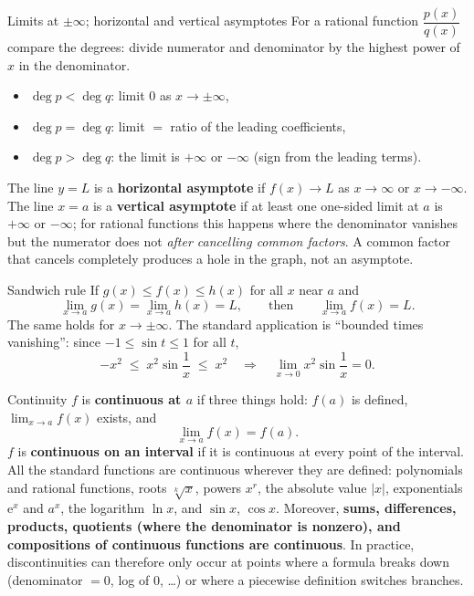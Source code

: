 \begin{rulebox}{Limits at $\pm\infty$; horizontal and vertical asymptotes}
For a rational function $\dfrac{p(x)}{q(x)}$ compare the degrees: divide
numerator and denominator by the highest power of $x$ in the denominator.
\begin{itemize}[leftmargin=1.6em,itemsep=0.3ex]
  \item $\deg p<\deg q$: \quad limit $0$ as $x\to\pm\infty$,
  \item $\deg p=\deg q$: \quad limit $=$ ratio of the leading
        coefficients,
  \item $\deg p>\deg q$: \quad the limit is $+\infty$ or $-\infty$
        (sign from the leading terms).
\end{itemize}
The line $y=L$ is a \textbf{horizontal asymptote} if $f(x)\to L$ as $x\to\infty$ or $x\to-\infty$. The line
$x=a$ is a \textbf{vertical asymptote} if at
least one one-sided limit at $a$ is $+\infty$ or $-\infty$; for rational
functions this happens where the denominator vanishes but the numerator
does not \emph{after cancelling common factors}. A common factor that
cancels completely produces a hole in the graph, not an asymptote.
\end{rulebox}

\begin{rulebox}{Sandwich rule}
If $g(x)\le f(x)\le h(x)$ for all $x$ near $a$ and
\[
  \lim_{x\to a}g(x)=\lim_{x\to a}h(x)=L,
  \qquad\text{then}\qquad
  \lim_{x\to a}f(x)=L .
\]
The same holds for $x\to\pm\infty$. The standard application is
``bounded times vanishing'': since $-1\le\sin t\le 1$ for all $t$,
\[
  -x^{2}\;\le\; x^{2}\sin\frac{1}{x}\;\le\; x^{2}
  \quad\Longrightarrow\quad
  \lim_{x\to 0}x^{2}\sin\frac{1}{x}=0 .
\]
\end{rulebox}

\begin{rulebox}{Continuity}
$f$ is \textbf{continuous at $a$} if three things hold:
$f(a)$ is defined, $\lim_{x\to a}f(x)$ exists, and
\[
  \lim_{x\to a}f(x)=f(a) .
\]
$f$ is \textbf{continuous on an interval} if it is continuous at every
point of the interval. All the standard functions are continuous wherever
they are defined: polynomials and rational functions, roots $\sqrt[k]{x}$,
powers $x^{r}$, the absolute value $|x|$, exponentials $\mathrm{e}^{x}$
and $a^{x}$, the logarithm $\ln x$, and $\sin x$, $\cos x$. Moreover,
\textbf{sums, differences, products, quotients (where the denominator is
nonzero), and compositions of continuous functions are continuous}. In
practice, discontinuities can therefore only occur at points where a
formula breaks down (denominator $=0$, log of $0$, \dots) or where a
piecewise definition switches branches.
\end{rulebox}

